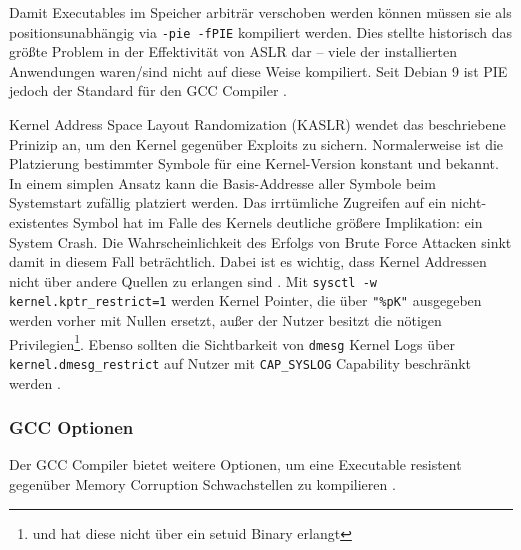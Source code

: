 Damit Executables im Speicher arbiträr verschoben werden können müssen sie als positionsunabhängig via \texttt{-pie -fPIE} kompiliert werden. Dies stellte historisch das größte Problem in der Effektivität von ASLR dar -- viele der installierten Anwendungen waren/sind nicht auf diese Weise kompiliert. Seit Debian 9 ist PIE jedoch der Standard für den GCC Compiler \cite{debian-9}.

Kernel Address Space Layout Randomization (KASLR) wendet das beschriebene Prinizip an, um den Kernel gegenüber Exploits zu sichern. Normalerweise ist die Platzierung bestimmter Symbole für eine Kernel-Version konstant und bekannt. In einem simplen Ansatz kann die Basis-Addresse aller Symbole beim Systemstart zufällig platziert werden. Das irrtümliche Zugreifen auf ein nicht-existentes Symbol hat im Falle des Kernels deutliche größere Implikation: ein System Crash. Die Wahrscheinlichkeit
des Erfolgs von Brute Force Attacken sinkt damit in diesem Fall beträchtlich. Dabei ist es wichtig, dass Kernel Addressen nicht über andere Quellen zu erlangen sind \cite{lwn-kaslr}. Mit \texttt{sysctl -w kernel.kptr\_restrict=1}  werden Kernel Pointer, die über \texttt{"\%pK"} ausgegeben werden vorher mit Nullen ersetzt, außer der Nutzer besitzt die nötigen Privilegien\footnote{und hat diese nicht über ein setuid Binary erlangt}. Ebenso sollten die Sichtbarkeit von \texttt{dmesg} Kernel Logs
über \texttt{kernel.dmesg\_restrict} auf Nutzer mit \texttt{CAP\_SYSLOG} Capability beschränkt werden \cite{sysctl-kernel}.


\subsubsection{GCC Optionen}

Der GCC Compiler bietet weitere Optionen, um eine Executable resistent gegenüber Memory Corruption Schwachstellen zu kompilieren \cite{deb-hardening}.

